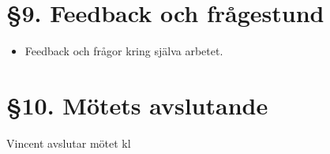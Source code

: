 \documentclass[a4paper, 11pt]{article}
\begin{document}
\section*{§9. Feedback och frågestund}
\begin{itemize}
    \item Feedback och frågor kring själva arbetet.\\
\end{itemize}
    \section*{§10. Mötets avslutande}
Vincent avslutar mötet kl 
\newpage
\thispagestyle{style2}
\makebox{}\\
\makebox{}\\
\makebox{}\\
\makebox[0.4\linewidth]{\rule{0.4\linewidth}{0.4pt}} \hspace{1cm} \makebox[0.4\linewidth]{\rule{0.4\linewidth}{0.4pt}} \hspace{1cm}\\
 \hspace{1cm}
 \hspace{1cm}\\
 \hspace{1cm}
 \hspace{1cm}\\
\makebox{}\\
\makebox{}\\
\makebox{}\\
\end{document}

